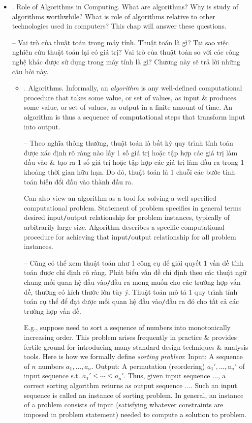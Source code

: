 \documentclass{article}
\begin{document}
\begin{itemize}
\begin{itemize}
\begin{enumerate}
		\end{enumerate}		
		\item {. Role of Algorithms in Computing.} What are algorithms? Why is study of algorithms worthwhile? What is role of algorithms relative to other technologies used in computers? This chap will answer these questions.
        
        -- {\sf Vai trò của thuật toán trong máy tính.} Thuật toán là gì? Tại sao việc nghiên cứu thuật toán lại có giá trị? Vai trò của thuật toán so với các công nghệ khác được sử dụng trong máy tính là gì? Chương này sẽ trả lời những câu hỏi này.
		\begin{itemize}
			\item {. Algorithms.} Informally, an {\it algorithm} is any well-defined computational procedure that takes some value, or set of values, as input \& produces some value, or set of values, as output in a finite amount of time. An algorithm is thus a sequence of computational steps that transform input into output.
			
			-- Theo nghĩa thông thường, thuật toán là bất kỳ quy trình tính toán được xác định rõ ràng nào lấy 1 số giá trị hoặc tập hợp các giá trị làm đầu vào \& tạo ra 1 số giá trị hoặc tập hợp các giá trị làm đầu ra trong 1 khoảng thời gian hữu hạn. Do đó, thuật toán là 1 chuỗi các bước tính toán biến đổi đầu vào thành đầu ra.
            
            Can also view an algorithm as a tool for solving a well-specified computational problem. Statement of problem specifies in general terms desired input{\tt/}output relationship for problem instances, typically of arbitrarily large size. Algorithm describes a specific computational procedure for achieving that input{\tt/}output relationship for all problem instances.
            
            -- Cũng có thể xem thuật toán như 1 công cụ để giải quyết 1 vấn đề tính toán được chỉ định rõ ràng. Phát biểu vấn đề chỉ định theo các thuật ngữ chung mối quan hệ đầu vào{\tt/}đầu ra mong muốn cho các trường hợp vấn đề, thường có kích thước lớn tùy ý. Thuật toán mô tả 1 quy trình tính toán cụ thể để đạt được mối quan hệ đầu vào{\tt/}đầu ra đó cho tất cả các trường hợp vấn đề.
            
            E.g., suppose need to sort a sequence of numbers into monotonically increasing order. This problem arises frequently in practice \& provides fertile ground for introducing many standard design techniques \& analysis tools. Here is how we formally define {\it sorting problem}: Input: A sequence of $n$ numbers $a_1,\ldots,a_n$. Output: A permutation (reordering) $a_1',\ldots,a_n'$ of input sequence s.t. $a_1'\le\cdots\le a_n'$. Thus, given input sequence $\ldots$, a correct sorting algorithm returns as output sequence $\ldots$. Such an input sequence is called an instance of sorting problem. In general, an instance of a problem consists of input (satisfying whatever constraints are imposed in problem statement) needed to compute a solution to problem.
            

\end{itemize}
\end{itemize}
\end{itemize}
\end{document}
